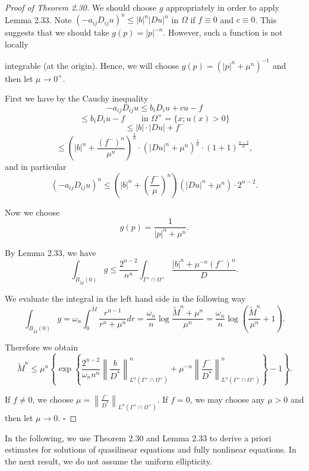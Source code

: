 \begin{proof}[Proof of Theorem 2.30]
\sketch
We should choose $g$ appropriately in order to apply
Lemma 2.33. Note $(-a_{ij}D_{ij}u)^n\le |b|^n|Du|^n$ in $\Omega$ if $f\equiv 0$ and $c\equiv 0$. This
suggests that we should take $g(p)=|p|^{-n}$. However, such a function is not locally

integrable (at the origin). Hence, we will choose $g(p) = (|p|^n + \mu^n)^{-1}$ and then let
$\mu \to 0^+$.

First we have by the Cauchy inequality
\[
-a_{ij}D_{ij}u \leq b_iD_i u + cu - f
\]
\[
\leq b_iD_i u - f \qquad \text{in } \Omega^+ = \{x;u(x)>0\}
\]
\[
\leq |b| \cdot |Du| + f^-
\]
\[
\leq \left(|b|^n + \frac{(f^-)^n}{\mu^n}\right)^{\frac{1}{n}} \cdot (|Du|^n + \mu^n)^{\frac{1}{n}} \cdot (1+1)^{\frac{n-2}{n}},
\]
and in particular
\[
(-a_{ij}D_{ij}u)^n \leq \left(|b|^n + \left(\frac{f^-}{\mu}\right)^n\right)(|Du|^n + \mu^n)\cdot 2^{n-2}.
\]

Now we choose
\[
g(p) = \frac{1}{|p|^n + \mu^n}.
\]

By Lemma 2.33, we have
\[
\int_{B_{\tilde M}(0)} g \leq \frac{2^{n-2}}{n^n} \int_{\Gamma^+\cap\Omega^+} \frac{|b|^n + \mu^{-n}(f^-)^n}{D}.
\]

We evaluate the integral in the left hand side in the following way
\[
\int_{B_{\tilde M}(0)} g = \omega_n \int_0^{\tilde M} \frac{r^{n-1}}{r^n + \mu^n}dr = \frac{\omega_n}{n}\log \frac{\tilde M^n + \mu^n}{\mu^n} = \frac{\omega_n}{n}\log\left(\frac{\tilde M^n}{\mu^n} + 1\right).
\]

Therefore we obtain
\[
\tilde M^n \leq \mu^n \left\{\exp\left\{\frac{2^{n-2}}{\omega_n n^n}\left\|\frac{b}{D^*}\right\|_{L^n(\Gamma^+\cap\Omega^+)}^n + \mu^{-n}\left\|\frac{f^-}{D^*}\right\|_{L^n(\Gamma^+\cap\Omega^+)}^n\right\} - 1\right\}.
\]

If $f \neq 0$, we choose $\mu = \left\|\frac{f^-}{D^*}\right\|_{L^n(\Gamma^+\cap\Omega^+)}$. If $f = 0$, we may choose any $\mu > 0$ and
then let $\mu \to 0$.
\hfill$\square$
\end{proof}

In the following, we use Theorem 2.30 and Lemma 2.33 to derive a priori
estimates for solutions of quasilinear equations and fully nonlinear equations. In
the next result, we do not assume the uniform ellipticity.


